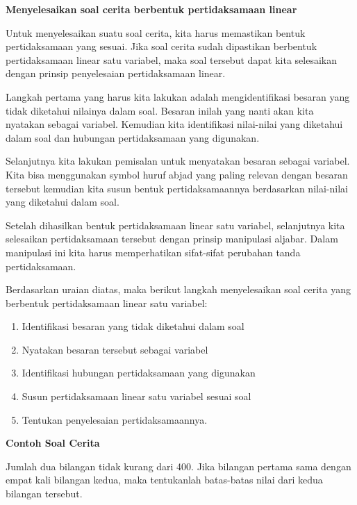 \documentclass[11pt,fleqn]{book} %
\begin{document}
\noindent \textbf{Menyelesaikan soal cerita berbentuk pertidaksamaan linear}

\noindent Untuk menyelesaikan suatu soal cerita, kita harus memastikan bentuk pertidaksamaan yang sesuai. Jika soal cerita sudah dipastikan berbentuk pertidaksamaan linear satu variabel, maka soal tersebut dapat kita selesaikan dengan prinsip penyelesaian pertidaksamaan linear.

\noindent Langkah pertama yang harus kita lakukan adalah mengidentifikasi besaran yang tidak diketahui nilainya dalam soal. Besaran inilah yang nanti akan kita nyatakan sebagai variabel. Kemudian kita identifikasi nilai-nilai yang diketahui dalam soal dan hubungan pertidaksamaan yang digunakan.

\noindent Selanjutnya kita lakukan pemisalan untuk menyatakan besaran sebagai variabel. Kita bisa menggunakan symbol huruf abjad yang paling relevan dengan besaran tersebut kemudian kita susun bentuk pertidaksamaannya berdasarkan nilai-nilai yang diketahui dalam soal.

\noindent Setelah dihasilkan bentuk pertidaksamaan linear satu variabel, selanjutnya kita selesaikan pertidaksamaan tersebut dengan prinsip manipulasi aljabar. Dalam manipulasi ini kita harus memperhatikan sifat-sifat perubahan tanda pertidaksamaan.

\noindent Berdasarkan uraian diatas, maka berikut langkah menyelesaikan soal cerita yang berbentuk pertidaksamaan linear satu variabel:

\begin{enumerate}
\item  Identifikasi besaran yang tidak diketahui dalam soal

\item  Nyatakan besaran tersebut sebagai variabel

\item  Identifikasi hubungan pertidaksamaan yang digunakan

\item  Susun pertidaksamaan linear satu variabel sesuai soal 

\item  Tentukan penyelesaian pertidaksamaannya.
\end{enumerate}

\noindent \textbf{Contoh Soal Cerita}

\noindent Jumlah dua bilangan tidak kurang dari 400. Jika bilangan pertama sama dengan empat kali bilangan kedua, maka tentukanlah batas-batas nilai dari kedua bilangan tersebut.
\end{document}
